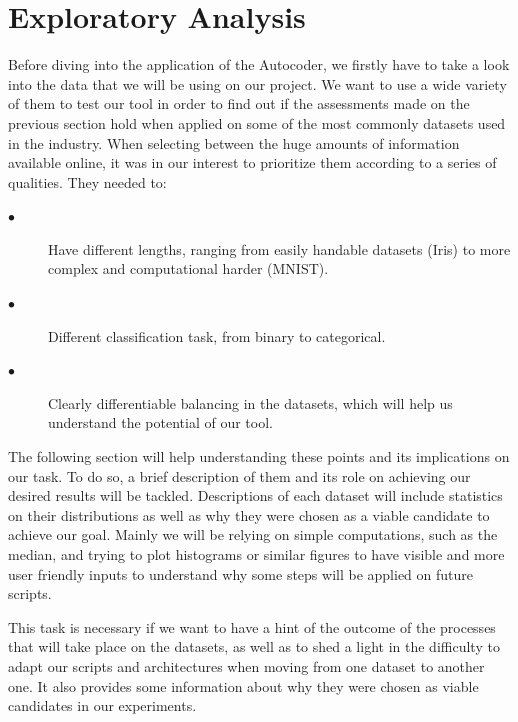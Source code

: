\section{Exploratory Analysis}

Before diving into the application of the Autocoder, we firstly have to take a look into the data that we will be using on our project. We want to use a wide variety of them to test our tool in order to find out if the assessments made on the previous section hold when applied on some of the most commonly datasets used in the industry. When selecting between the huge amounts of information available online, it was in our interest to prioritize them according to a series of qualities. They needed to:
 
\begin{description}
	
\item[$\bullet$] Have different lengths, ranging from easily handable datasets (Iris) to more complex and computational harder (MNIST).

\item[$\bullet$] Different classification task, from binary to categorical.

\item[$\bullet$] Clearly differentiable balancing in the datasets, which will help us understand the potential of our tool.

\end{description}

The following section will help understanding these points and its implications on our task. To do so, a brief description of them and its role on achieving our desired results will be tackled. Descriptions of each dataset will include statistics on their distributions as well as why they were chosen as a viable candidate to achieve our goal. Mainly we will be relying on simple computations, such as the median, and trying to plot histograms or similar figures to have visible and more user friendly inputs to understand why some steps will be applied on future scripts.\par
 
This task is necessary if we want to have a hint of the outcome of the processes that will take place on the datasets, as well as to shed a light in the difficulty to adapt our scripts and architectures when moving from one dataset to another one. It also provides some information about why they were chosen as viable candidates in our experiments.


